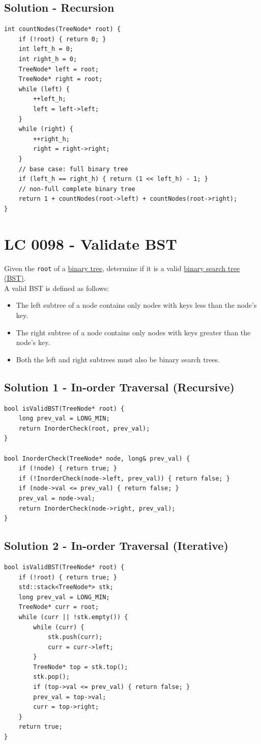 \subsection*{Solution - Recursion}
\begin{lstlisting}
int countNodes(TreeNode* root) {
	if (!root) { return 0; }
	int left_h = 0;
	int right_h = 0;
	TreeNode* left = root;
	TreeNode* right = root;
	while (left) {
		++left_h;
		left = left->left;
	}
	while (right) {
		++right_h;
		right = right->right;
	}
	// base case: full binary tree
	if (left_h == right_h) { return (1 << left_h) - 1; }
	// non-full complete binary tree
	return 1 + countNodes(root->left) + countNodes(root->right);
}
\end{lstlisting}

\section{LC 0098 - Validate BST}\label{lc0098}
Given the {\colorbox{CodeBackground}{\lstinline|root|}} of a \ul{binary tree}, determine if it is a valid \ul{binary search tree (BST)}.\\

A valid BST is defined as follows:
\begin{itemize}
	\item The left subtree of a node contains only nodes with keys less than the node's key.
	\item The right subtree of a node contains only nodes with keys greater than the node's key.
	\item Both the left and right subtrees must also be binary search trees.
\end{itemize}

\subsection*{Solution 1 - In-order Traversal (Recursive)}
\begin{lstlisting}
bool isValidBST(TreeNode* root) {
	long prev_val = LONG_MIN;
	return InorderCheck(root, prev_val);
}

bool InorderCheck(TreeNode* node, long& prev_val) {
	if (!node) { return true; }
	if (!InorderCheck(node->left, prev_val)) { return false; }
	if (node->val <= prev_val) { return false; }
	prev_val = node->val;
	return InorderCheck(node->right, prev_val);
}
\end{lstlisting}

\subsection*{Solution 2 - In-order Traversal (Iterative)}
\begin{lstlisting}
bool isValidBST(TreeNode* root) {
	if (!root) { return true; }
	std::stack<TreeNode*> stk;
	long prev_val = LONG_MIN;
	TreeNode* curr = root;
	while (curr || !stk.empty()) {
		while (curr) {
			stk.push(curr);
			curr = curr->left;
		}
		TreeNode* top = stk.top();
		stk.pop();
		if (top->val <= prev_val) { return false; }
		prev_val = top->val;
		curr = top->right;
	}
	return true;
}
\end{lstlisting}

